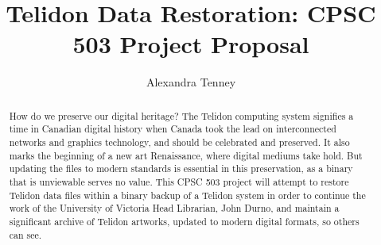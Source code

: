 \documentclass[sigconf]{acmart}
\begin{document}
\title{Telidon Data Restoration: CPSC 503 Project Proposal}

\author{Alexandra Tenney}
\begin{abstract}
 How do we preserve our digital heritage? The Telidon computing system signifies a time in Canadian digital history when Canada took the lead on interconnected networks and graphics technology, and should be celebrated and preserved. It also marks the beginning of a new art Renaissance, where digital mediums take hold. But updating the files to modern standards is essential in this preservation, as a binary that is unviewable serves no value. This CPSC 503 project will attempt to restore Telidon data files within a binary backup of a Telidon system in order to continue the work of the University of Victoria Head Librarian, John Durno, and maintain a significant archive of Telidon artworks, updated to modern digital formats, so others can see.
\end{abstract}


\maketitle
\end{document}
